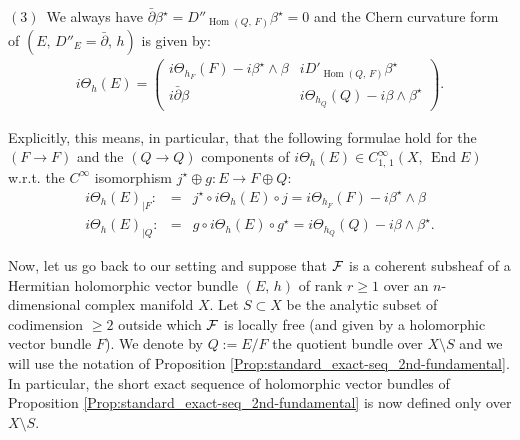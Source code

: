 \documentclass[12pt]{article}
\begin{document}
\begin{Prop}
\vspace{1ex}

$(3)$\, We always have $\bar\partial\beta^\star = D''_{\operatorname{Hom}(Q,\,F)}\beta^\star = 0$ and the Chern curvature form of $(E,\, D''_E=\bar\partial,\, h)$ is given by: \begin{eqnarray*}i\Theta_h(E) = \begin{pmatrix} i\Theta_{h_F}(F) - i\beta^\star\wedge\beta   &  iD'_{\operatorname{Hom}(Q,\,F)}\beta^\star  \\
    i\bar\partial\beta &   i\Theta_{h_Q}(Q) - i\beta\wedge\beta^\star\end{pmatrix}.\end{eqnarray*}

Explicitly, this means, in particular, that the following formulae hold for the $(F\to F)$ and the $(Q\to Q)$ components of $i\Theta_h(E)\in C^\infty_{1,\,1}(X,\,\operatorname{End}E)$ w.r.t. the $C^\infty$ isomorphism $j^\star\oplus g:E\longrightarrow F\oplus Q$: \begin{eqnarray}\label{eqn:curvature_subbundle}i\Theta_h(E)_{|F}: & = & j^\star\circ i\Theta_h(E)\circ j = i\Theta_{h_F}(F) - i\beta^\star\wedge\beta \\
 \label{eqn:curvature_quot-bundle} i\Theta_h(E)_{|Q}: & = & g\circ i\Theta_h(E)\circ g^\star = i\Theta_{h_Q}(Q) - i\beta\wedge\beta^\star.\end{eqnarray} 


\end{Prop}


\vspace{2ex}

Now, let us go back to our setting and suppose that ${\cal F}$ is a coherent subsheaf of a Hermitian holomorphic vector bundle $(E,\,h)$ of rank $r\geq 1$ over an $n$-dimensional complex manifold $X$. Let $S\subset X$ be the analytic subset of codimension $\geq 2$ outside which ${\cal F}$ is locally free (and given by a holomorphic vector bundle $F$). We denote by $Q:=E/F$ the quotient bundle over $X\setminus S$ and we will use the notation of Proposition \ref{Prop:standard_exact-seq_2nd-fundamental}. In particular, the short exact sequence of holomorphic vector bundles of Proposition \ref{Prop:standard_exact-seq_2nd-fundamental} is now defined only over $X\setminus S$.
\end{document}
